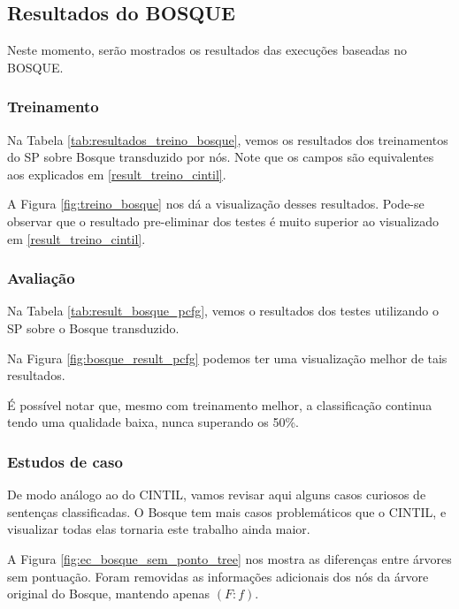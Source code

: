 \subsection{Resultados do BOSQUE}
\label{resultados_bosque}
Neste momento, serão mostrados os resultados das execuções baseadas no BOSQUE.

\subsubsection{Treinamento} \label{result_treino_bosque}
Na Tabela \ref{tab:resultados_treino_bosque}, vemos os resultados dos treinamentos do SP sobre Bosque transduzido por nós. Note que os campos são equivalentes aos explicados em \ref{result_treino_cintil}.
\begin{center}
    
\end{center}
A Figura \ref{fig:treino_bosque} nos dá a visualização desses resultados. Pode-se observar que o resultado pre-eliminar dos testes é muito superior ao visualizado em \ref{result_treino_cintil}.
\begin{center}
    
\end{center}

\subsubsection{Avaliação} \label{result_aval_bosque}
Na Tabela \ref{tab:result_bosque_pcfg}, vemos o resultados dos testes utilizando o SP sobre o Bosque transduzido.
\begin{center}
    
\end{center}
Na Figura \ref{fig:bosque_result_pcfg} podemos ter uma visualização melhor de tais resultados.

\begin{center}
    
\end{center}
É possível notar que, mesmo com treinamento melhor, a classificação continua tendo uma qualidade baixa, nunca superando os 50\%.


\subsubsection{Estudos de caso}
\label{subsec:ec-bosque}

De modo análogo ao do CINTIL, vamos revisar aqui alguns casos curiosos de sentenças classificadas. O Bosque tem mais casos problemáticos que o CINTIL, e visualizar todas elas tornaria este trabalho ainda maior.
\begin{center}
    
\end{center}
A Figura \ref{fig:ec_bosque_sem_ponto_tree} nos mostra as diferenças entre árvores sem pontuação. Foram removidas as informações adicionais dos nós da árvore original do Bosque, mantendo apenas $(F:f)$.

